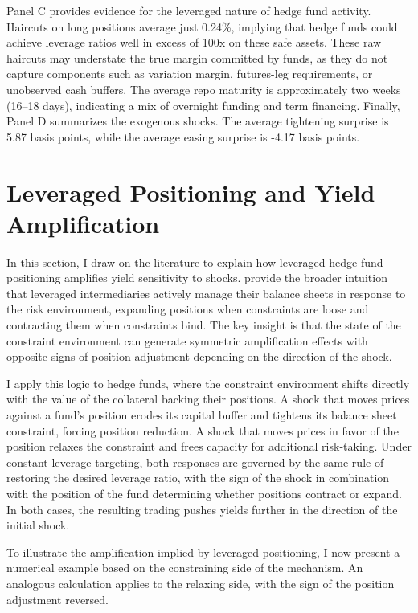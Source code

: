 \documentclass[english, 11pt, oneside]{article}
\begin{document}
Panel C provides evidence for the leveraged nature of hedge fund activity. Haircuts on long positions average just 0.24\%, implying that hedge funds could achieve leverage ratios well in excess of 100x on these safe assets. These raw haircuts may understate the true margin committed by funds, as they do not capture components such as variation margin, futures-leg requirements, or unobserved cash buffers. The average repo maturity is approximately two weeks (16–18 days), indicating a mix of overnight funding and term financing. Finally, Panel D summarizes the exogenous shocks. The average tightening surprise is 5.87 basis points, while the average easing surprise is -4.17 basis points.







\section{Leveraged Positioning and Yield Amplification}
\label{sec:mechanism}

In this section, I draw on the literature to explain how leveraged hedge fund positioning amplifies yield sensitivity to shocks. \citet{adrian2014} provide the broader intuition that leveraged intermediaries actively manage their balance sheets in response to the risk environment, expanding positions when constraints are loose and contracting them when constraints bind. The key insight is that the state of the constraint environment can generate symmetric amplification effects with opposite signs of position adjustment depending on the direction of the shock.

I apply this logic to hedge funds, where the constraint environment shifts directly with the value of the collateral backing their positions. A shock that moves prices against a fund's position erodes its capital buffer and tightens its balance sheet constraint, forcing position reduction. A shock that moves prices in favor of the position relaxes the constraint and frees capacity for additional risk-taking. Under constant-leverage targeting, both responses are governed by the same rule of restoring the desired leverage ratio, with the sign of the shock in combination with the position of the fund determining whether positions contract or expand. In both cases, the resulting trading pushes yields further in the direction of the initial shock.

To illustrate the amplification implied by leveraged positioning, I now present a numerical example based on the constraining side of the mechanism. An analogous calculation applies to the relaxing side, with the sign of the position adjustment reversed.
\end{document}
